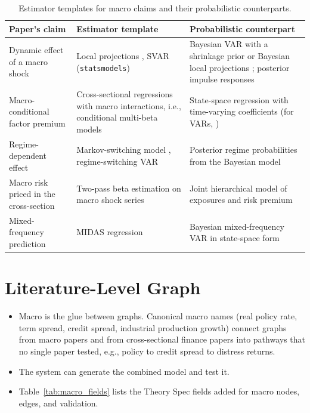   \begin{table}[H]
    \centering
    \begin{tabularx}{\linewidth}{lXX}
      \toprule
      Paper's claim & Estimator template & Probabilistic counterpart \\
      \midrule
      Dynamic effect of a macro shock & Local projections
      \cite{jorda2005local}, SVAR (\texttt{statsmodels}) & Bayesian VAR with a
      shrinkage prior \cite{giannone2015prior} or Bayesian local projections
      \cite{ferreira2025bayesian}; posterior impulse responses \\
      Macro-conditional factor premium & Cross-sectional regressions with
      macro interactions, i.e., conditional multi-beta models
      \cite{ferson1991variation} & State-space regression with time-varying
      coefficients (for VARs, \cite{primiceri2005time}) \\
      Regime-dependent effect & Markov-switching model
      \cite{hamilton1989new}, regime-switching VAR \cite{sims2006were} &
      Posterior regime probabilities from the Bayesian model \\
      Macro risk priced in the cross-section & Two-pass beta estimation on
      macro shock series & Joint hierarchical model of exposures and risk
      premium \\
      Mixed-frequency prediction & MIDAS regression
      \cite{ghysels2007midas} & Bayesian mixed-frequency VAR in state-space
      form \cite{schorfheide2015real} \\
      \bottomrule
    \end{tabularx}
    \caption{Estimator templates for macro claims and their probabilistic
      counterparts.}
    \label{tab:estimator_templates}
  \end{table}

  \section{Literature-Level Graph}\label{sec:literature_graph}

  \begin{itemize}
  \tightlist
  \item
    Macro is the glue between graphs. Canonical macro names (real policy
    rate, term spread, credit spread, industrial production growth)
    connect graphs from macro papers and from cross-sectional finance
    papers into pathways that no single paper tested, e.g., policy to
    credit spread to distress returns.
  \item
    The system can generate the combined model and test it.
  \item
    Table~\ref{tab:macro_fields} lists the Theory Spec fields added for
    macro nodes, edges, and validation.
  \end{itemize}


